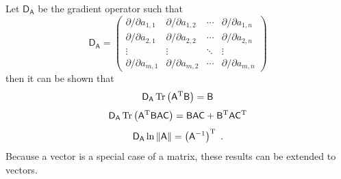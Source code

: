 \documentclass[12pt]{report}
\DeclareMathOperator{\trace}{Tr}
\newcommand{\T}{^\textup{T}}
\newcommand{\matr}[1]{\mathsf{#1}}
\begin{document}
Let $\matr{D_{A}}$ be the gradient operator such that
\begin{equation*}
\matr{D_{A}}=
\begin{pmatrix}
\partial/\partial a_{1,1}&\partial/\partial a_{1,2}&\cdots&\partial/\partial a_{1,n} \\
\partial/\partial a_{2,1}&\partial/\partial a_{2,2}&\cdots&\partial/\partial a_{2,n} \\
\vdots&\vdots&\ddots&\vdots \\
\partial/\partial a_{m,1}&\partial/\partial a_{m,2}&\cdots&\partial/\partial a_{m,n} 
\end{pmatrix}
\end{equation*}
then it can be shown that \cite{petersen2008matrix}
\begin{equation}
\matr{D_{A}}\trace\left(\matr{A}\T\matr{B}\right) = \matr{B}
\end{equation}
\begin{equation}
\matr{D_{A}}\trace\left(\matr{A}\T\matr{B}\matr{A}\matr{C}\right) = \matr{B}\matr{A}\matr{C}+\matr{B}\T\matr{A}\matr{C}\T
\end{equation}
\begin{equation}
\matr{D_{A}}\ln\left\|\matr{A}\right\| = \left(\matr{A}^{-1}\right)\T \ .
\end{equation}
Because a vector is a special case of a matrix, these results can be extended to vectors.
\end{document}

